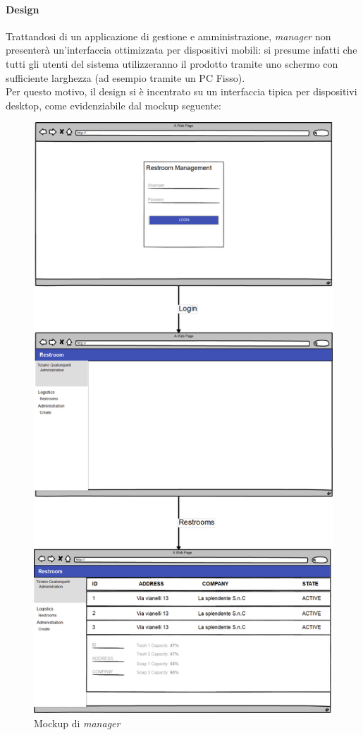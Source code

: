\documentclass[12pt]{article}
\begin{document}
\paragraph{Design}
Trattandosi di un applicazione di gestione e amministrazione, \textit{manager} non presenterà un'interfaccia ottimizzata per dispositivi mobili: si presume infatti che tutti gli utenti del sistema utilizzeranno il prodotto tramite uno schermo con sufficiente larghezza (ad esempio tramite un PC Fisso).\\Per questo motivo, il design si è incentrato su un interfaccia tipica per dispositivi desktop, come evidenziabile dal mockup seguente: 
\begin{figure}[h!]
\centering
  \includegraphics[scale=0.20]{img/mockup-manager.png}
  \caption{Mockup di \textit{manager}}
\end{figure}\\
\end{document}
